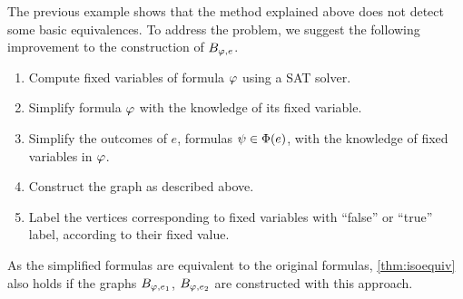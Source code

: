The previous example shows that the method explained above
  does not detect some basic equivalences.
To address the problem, we suggest the following improvement to the construction
  of $B_{\varphi, e}$.
\begin{enumerate}
\item Compute fixed variables of formula $\varphi$ using a SAT solver.
\item Simplify formula $\varphi$ with the knowledge of its fixed variable.
\item Simplify the outcomes of $e$, formulas $\psi\in\Phi(e)$, with
  the knowledge of fixed variables in $\varphi$.
\item Construct the graph as described above.
\item Label the vertices corresponding to fixed variables with ``false'' or ``true'' label,
  according to their fixed value.
\end{enumerate}

As the simplified formulas are equivalent to the original formulas,
\autoref{thm:isoequiv} also holds if the graphs $B_{\varphi, e_1}$, $B_{\varphi, e_2}$
are constructed with this approach.

